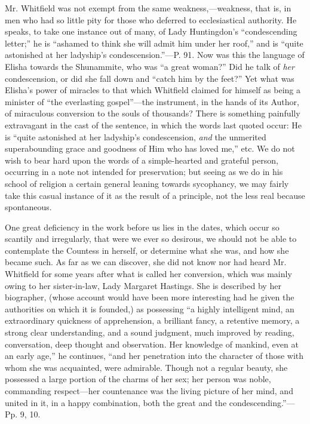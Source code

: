 Mr. Whitfield was not exempt from the same
weakness,—weakness, that is, in men who had so little pity for those
who deferred to ecclesiastical authority. He speaks, to take one
instance out of many, of Lady Huntingdon's ``condescending letter;'' he
is ``ashamed to think she will admit him under her roof,'' and is ``quite
astonished at her ladyship's condescension.''—P. 91. Now was this the
language of Elisha towards the Shunammite, who was ``a great woman?''
Did he talk of \emph{her} condescension, or did she fall down and ``catch
him by the feet?'' Yet what was Elisha's power of miracles to that
which Whitfield claimed for himself as being a minister of ``the
everlasting gospel''—the instrument, in the hands of its Author, of
miraculous conversion to the souls of thousands? There is something
painfully extravagant in the cast of the sentence, in which the words
last quoted occur: He is ``quite astonished at her ladyship's
condescension, \emph{and} the unmerited superabounding grace and goodness of
Him who has loved me,'' etc. We do not wish to bear hard upon the words
of a simple-hearted and grateful person, occurring in a note not
intended for preservation; but seeing as we do in his school of
religion a certain general leaning towards sycophancy, we may fairly
take this casual instance of it as the result of a principle, not the
less real because spontaneous.

One great deficiency in the work before us lies
in the dates, which occur so scantily and irregularly, that were we
ever so desirous, we should not be able to contemplate the Countess in
herself, or determine what she was, and how she became such. As far as
we can discover, she did not know nor had heard Mr. Whitfield for some
years after what is called her conversion, which was mainly owing to
her sister-in-law, Lady Margaret Hastings. She is described by her
biographer, (whose account would have been more interesting had he
given the authorities on which it is founded,) as possessing ``a highly
intelligent mind, an extraordinary quickness of apprehension, a
brilliant fancy, a retentive memory, a strong clear understanding, and
a sound judgment, much improved by reading, conversation, deep thought
and observation. Her knowledge of mankind, even at an early age,'' he
continues, ``and her penetration into the character of those with whom
she was acquainted, were admirable. Though not a regular beauty, she
possessed a large portion of the charms of her sex; her person was
noble, commanding respect—her countenance was the living
picture of her mind, and united in it, in a happy combination, both
the great and the condescending.''—Pp. 9, 10.

